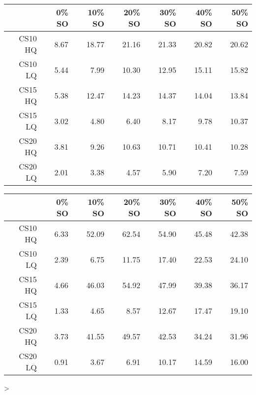 \begin{table}[ht]
\begin{center}
\begin{tabular}{rrrrrrr}
  \hline
 & 0\% SO & 10\% SO & 20\% SO & 30\% SO & 40\% SO & 50\% SO \\
  \hline
CS10 HQ & 8.67 & 18.77 & 21.16 & 21.33 & 20.82 & 20.62 \\
  CS10 LQ & 5.44 & 7.99 & 10.30 & 12.95 & 15.11 & 15.82 \\
  CS15 HQ & 5.38 & 12.47 & 14.23 & 14.37 & 14.04 & 13.84 \\
  CS15 LQ & 3.02 & 4.80 & 6.40 & 8.17 & 9.78 & 10.37 \\
  CS20 HQ & 3.81 & 9.26 & 10.63 & 10.71 & 10.41 & 10.28 \\
  CS20 LQ & 2.01 & 3.38 & 4.57 & 5.90 & 7.20 & 7.59 \\
   \hline
\end{tabular}
\end{center}
\end{table}
\begin{table}[ht]
\begin{center}
\begin{tabular}{rrrrrrr}
  \hline
 & 0\% SO & 10\% SO & 20\% SO & 30\% SO & 40\% SO & 50\% SO \\
  \hline
CS10 HQ & 6.33 & 52.09 & 62.54 & 54.90 & 45.48 & 42.38 \\
  CS10 LQ & 2.39 & 6.75 & 11.75 & 17.40 & 22.53 & 24.10 \\
  CS15 HQ & 4.66 & 46.03 & 54.92 & 47.99 & 39.38 & 36.17 \\
  CS15 LQ & 1.33 & 4.65 & 8.57 & 12.67 & 17.47 & 19.10 \\
  CS20 HQ & 3.73 & 41.55 & 49.57 & 42.53 & 34.24 & 31.96 \\
  CS20 LQ & 0.91 & 3.67 & 6.91 & 10.17 & 14.59 & 16.00 \\
   \hline
\end{tabular}
\end{center}
\end{table}
> 

